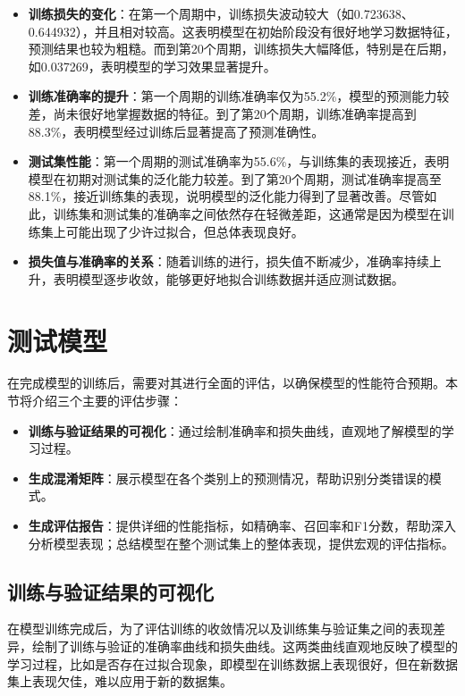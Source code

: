 \begin{itemize}
  \item \textbf{训练损失的变化}：在第一个周期中，训练损失波动较大（如0.723638、0.644932），并且相对较高。这表明模型在初始阶段没有很好地学习数据特征，预测结果也较为粗糙。而到第20个周期，训练损失大幅降低，特别是在后期，如0.037269，表明模型的学习效果显著提升。
  
  \item \textbf{训练准确率的提升}：第一个周期的训练准确率仅为55.2\%，模型的预测能力较差，尚未很好地掌握数据的特征。到了第20个周期，训练准确率提高到88.3\%，表明模型经过训练后显著提高了预测准确性。

  \item \textbf{测试集性能}：第一个周期的测试准确率为55.6\%，与训练集的表现接近，表明模型在初期对测试集的泛化能力较差。到了第20个周期，测试准确率提高至88.1\%，接近训练集的表现，说明模型的泛化能力得到了显著改善。尽管如此，训练集和测试集的准确率之间依然存在轻微差距，这通常是因为模型在训练集上可能出现了少许过拟合，但总体表现良好。

  \item \textbf{损失值与准确率的关系}：随着训练的进行，损失值不断减少，准确率持续上升，表明模型逐步收敛，能够更好地拟合训练数据并适应测试数据。
\end{itemize}
\section{测试模型} 

在完成模型的训练后，需要对其进行全面的评估，以确保模型的性能符合预期。本节将介绍三个主要的评估步骤：

\begin{itemize}
    \item \textbf{训练与验证结果的可视化}：通过绘制准确率和损失曲线，直观地了解模型的学习过程。
    \item \textbf{生成混淆矩阵}：展示模型在各个类别上的预测情况，帮助识别分类错误的模式。
    \item \textbf{生成评估报告}：提供详细的性能指标，如精确率、召回率和F1分数，帮助深入分析模型表现；总结模型在整个测试集上的整体表现，提供宏观的评估指标。
\end{itemize}

\subsection{训练与验证结果的可视化}

在模型训练完成后，为了评估训练的收敛情况以及训练集与验证集之间的表现差异，绘制了训练与验证的准确率曲线和损失曲线。这两类曲线直观地反映了模型的学习过程，比如是否存在过拟合现象，即模型在训练数据上表现很好，但在新数据集上表现欠佳，难以应用于新的数据集。

